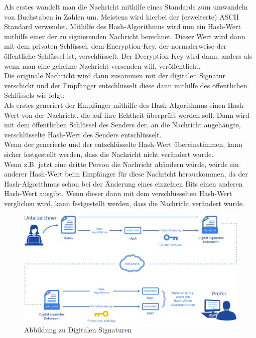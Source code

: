 \documentclass[14pt,a4paper]{scrartcl}
\begin{document}
Als erstes wandelt man die Nachricht mithilfe eines Standards zum umwandeln von Buchstaben in Zahlen um. Meistens wird hierbei der (erweiterte) ASCII Standard verwendet. %
Mithilfe des Hash-Algorithmus wird nun ein Hash-Wert mithilfe einer  der zu signierenden Nachricht berechnet. Dieser Wert wird dann mit dem privaten Schlüssel, dem Encryption-Key, der normalerweise der öffentliche Schlüssel ist, verschlüsselt. %
	Der Decryption-Key wird dann, anders als wenn man eine geheime Nachricht versenden will, veröffentlicht.\\
	Die originale Nachricht wird dann zusammen mit der digitalen Signatur verschickt und der Empfänger entschlüsselt diese dann mithilfe des öffentlichen Schlüssels wie folgt:\\
	Als erstes generiert der Empfänger mithilfe des Hash-Algorithmus einen Hash-Wert von der Nachricht, die auf ihre Echtheit überprüft werden soll. Dann wird mit dem öffentlichen Schlüssel des Senders der, an die Nachricht angehängte, verschlüsselte Hash-Wert des Senders entschlüsselt. \\
Wenn der generierte und der entschlüsselte Hash-Wert übereinstimmen, kann sicher festgestellt werden, dass die Nachricht nicht verändert wurde. \\
Wenn z.B. jetzt eine dritte Person die Nachricht abändern würde, würde ein anderer Hash-Wert beim Empfänger für diese Nachricht herauskommen, da der Hash-Algorithmus schon bei der Änderung eines einzelnen Bits einen anderen Hash-Wert ausgibt. Wenn dieser dann mit dem verschlüsselten Hash-Wert verglichen wird, kann festgestellt werden, dass die Nachricht verändert wurde.


\begin{figure}
\includegraphics[scale=0.45]{Dokument_digitale_Signatur}
\caption{Abbildung zu Digitalen Signaturen}
\label{fig:figure3}
\end{figure}
\end{document}
